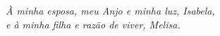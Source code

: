 \begin{dedicatoria}
   \vspace*{\fill}
   \centering
   \noindent
   \textit{ À minha esposa, meu Anjo e minha luz, Isabela,\\
   e à minha filha e razão de viver, Melisa.} \vspace*{\fill}
\end{dedicatoria}

